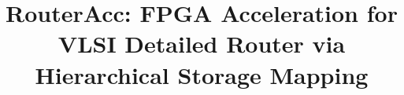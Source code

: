 \documentclass[conference]{IEEEtran}
\begin{document}
\title{RouterAcc: FPGA Acceleration for VLSI Detailed Router via Hierarchical Storage Mapping\\
}


\maketitle
\end{document}
